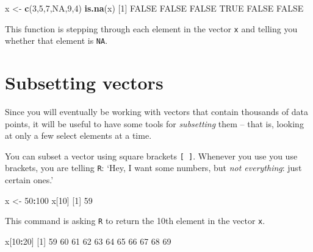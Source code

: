 \documentclass[]{book}
\newenvironment{Shaded}{\begin{snugshade}}{\end{snugshade}}
\newcommand{\DecValTok}[1]{\textcolor[rgb]{0.00,0.00,0.81}{#1}}
\newcommand{\KeywordTok}[1]{\textcolor[rgb]{0.13,0.29,0.53}{\textbf{#1}}}
\newcommand{\NormalTok}[1]{#1}
\newcommand{\OperatorTok}[1]{\textcolor[rgb]{0.81,0.36,0.00}{\textbf{#1}}}
\newcommand{\OtherTok}[1]{\textcolor[rgb]{0.56,0.35,0.01}{#1}}
\newcommand{\StringTok}[1]{\textcolor[rgb]{0.31,0.60,0.02}{#1}}
\begin{document}
\begin{Shaded}
\begin{Highlighting}[]
\NormalTok{x <-}\StringTok{ }\KeywordTok{c}\NormalTok{(}\DecValTok{3}\NormalTok{,}\DecValTok{5}\NormalTok{,}\DecValTok{7}\NormalTok{,}\OtherTok{NA}\NormalTok{,}\DecValTok{9}\NormalTok{,}\DecValTok{4}\NormalTok{)}
\KeywordTok{is.na}\NormalTok{(x)}
\NormalTok{[}\DecValTok{1}\NormalTok{] }\OtherTok{FALSE} \OtherTok{FALSE} \OtherTok{FALSE}  \OtherTok{TRUE} \OtherTok{FALSE} \OtherTok{FALSE}
\end{Highlighting}
\end{Shaded}

This function is stepping through each element in the vector \texttt{x} and telling you whether that element is \texttt{NA}.

\hypertarget{subsetting-vectors}{%
\section*{Subsetting vectors}\label{subsetting-vectors}}

Since you will eventually be working with vectors that contain thousands of data points, it will be useful to have some tools for \emph{subsetting} them -- that is, looking at only a few select elements at a time.

You can subset a vector using square brackets \texttt{{[}\ {]}}. Whenever you use you use brackets, you are telling \texttt{R}: `Hey, I want some numbers, but \emph{not everything}: just certain ones.'

\begin{Shaded}
\begin{Highlighting}[]
\NormalTok{x <-}\StringTok{ }\DecValTok{50}\OperatorTok{:}\DecValTok{100}
\NormalTok{x[}\DecValTok{10}\NormalTok{]}
\NormalTok{[}\DecValTok{1}\NormalTok{] }\DecValTok{59}
\end{Highlighting}
\end{Shaded}

This command is asking \texttt{R} to return the 10th element in the vector \texttt{x}.

\begin{Shaded}
\begin{Highlighting}[]
\NormalTok{x[}\DecValTok{10}\OperatorTok{:}\DecValTok{20}\NormalTok{]}
\NormalTok{ [}\DecValTok{1}\NormalTok{] }\DecValTok{59} \DecValTok{60} \DecValTok{61} \DecValTok{62} \DecValTok{63} \DecValTok{64} \DecValTok{65} \DecValTok{66} \DecValTok{67} \DecValTok{68} \DecValTok{69}
\end{Highlighting}
\end{Shaded}
\end{document}
